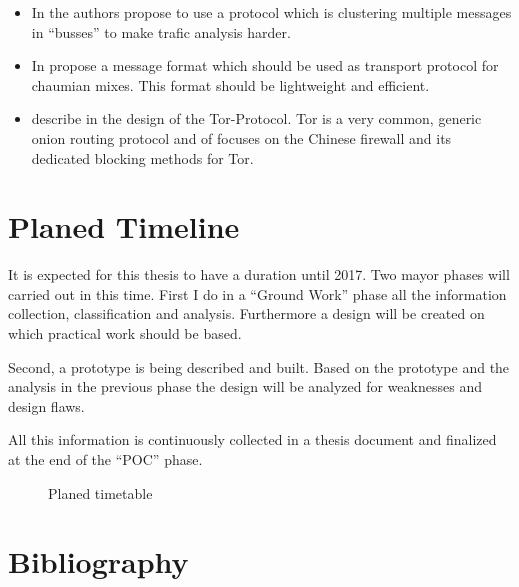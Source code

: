 \documentclass[twocolumn,a4paper,10pt,english]{article}
\begin{document}
\begin{itemize}
\item In \cite{buses03} the authors \citeauthor{buses03} propose to use a protocol which is clustering multiple messages in ``busses'' to make trafic analysis harder.
\item In \cite{danezis:wpes2004} \citeauthor{danezis:wpes2004} propose a message format which should be used as transport protocol for chaumian mixes. This format should be lightweight and efficient.
\item \citeauthor{tor-design} describe in \cite{tor-design} the design of the Tor-Protocol. Tor is a very common, generic onion routing protocol and \cite{foci12-winter} of \citeauthor{foci12-winter} focuses on the Chinese firewall and its dedicated blocking methods for Tor.
\end{itemize}

\section{Planed Timeline}
It is expected for this thesis to have a duration until 2017. Two mayor phases will carried out in this time. First I do in a ``Ground Work'' phase all the information collection, classification and analysis. Furthermore a design will be created on which practical work should be based.\par

Second, a prototype is being described and built. Based on the prototype and the analysis in the previous phase the design will be analyzed for weaknesses and design flaws.\par
All this information is continuously collected in a thesis document and finalized at the end of the ``POC'' phase.\par
\begin{figure}[H]%
\caption{Planed timetable}%
\label{Gant chart}%
\end{figure}

\section{Bibliography}
\printbibliography[title={},heading=none]
\end{document}
